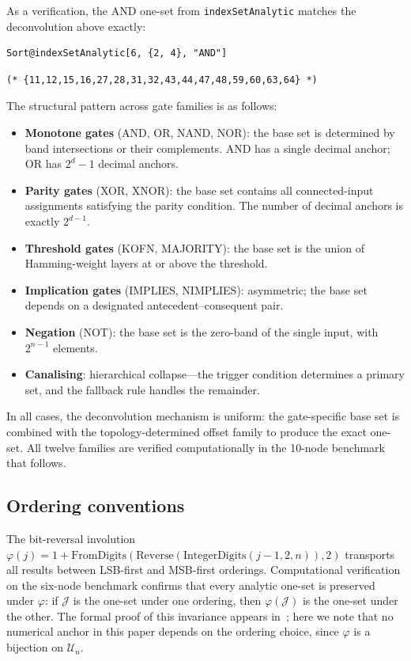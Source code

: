 \documentclass[11pt]{article}
\begin{document}
As a verification, the AND one-set from \texttt{indexSetAnalytic} matches the
deconvolution above exactly:

\begin{lstlisting}[style=MathematicaStyle]
Sort@indexSetAnalytic[6, {2, 4}, "AND"]
\end{lstlisting}
\begin{lstlisting}[style=MathematicaOutput]
(* {11,12,15,16,27,28,31,32,43,44,47,48,59,60,63,64} *)
\end{lstlisting}

The structural pattern across gate families is as follows:

\begin{itemize}
\item \textbf{Monotone gates} (AND, OR, NAND, NOR): the base set is
  determined by band intersections or their complements.  AND has a single
  decimal anchor; OR has $2^d-1$ decimal anchors.
\item \textbf{Parity gates} (XOR, XNOR): the base set contains all
  connected-input assignments satisfying the parity condition.  The number
  of decimal anchors is exactly $2^{d-1}$.
\item \textbf{Threshold gates} (KOFN, MAJORITY): the base set is the
  union of Hamming-weight layers at or above the threshold.
\item \textbf{Implication gates} (IMPLIES, NIMPLIES): asymmetric; the
  base set depends on a designated antecedent--consequent pair.
\item \textbf{Negation} (NOT): the base set is the zero-band of the
  single input, with $2^{n-1}$ elements.
\item \textbf{Canalising}: hierarchical collapse---the trigger condition
  determines a primary set, and the fallback rule handles the remainder.
\end{itemize}

In all cases, the deconvolution mechanism is uniform: the gate-specific
base set is combined with the topology-determined offset family to produce
the exact one-set.  All twelve families are verified computationally in
the 10-node benchmark that follows.


\subsection{Ordering conventions}\label{sec:ordering}

The bit-reversal involution $\varphi(j)=1+\mathrm{FromDigits}(\mathrm{Reverse}(\mathrm{IntegerDigits}(j{-}1,2,n)),2)$
transports all results between LSB-first and MSB-first orderings.
Computational verification on the six-node benchmark confirms that every
analytic one-set is preserved under $\varphi$: if $\mathcal{J}$ is the
one-set under one ordering, then $\varphi(\mathcal{J})$ is the one-set
under the other.  The formal proof of this invariance appears
in~\cite{formalmanuscript}; here we note that no numerical anchor in this
paper depends on the ordering choice, since $\varphi$ is a bijection on
$\mathcal{U}_n$.
\end{document}
